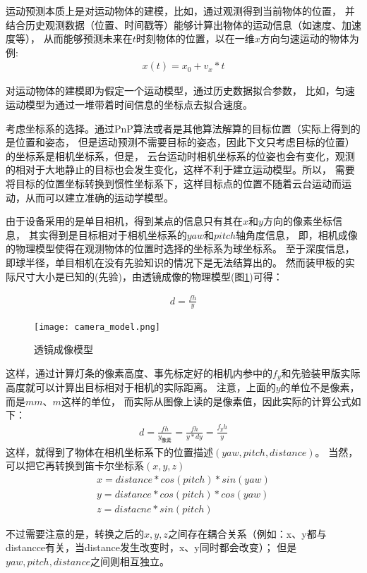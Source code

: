 运动预测本质上是对运动物体的建模，比如，通过观测得到当前物体的位置，
并结合历史观测数据（位置、时间戳等）能够计算出物体的运动信息（如速度、加速度等），
从而能够预测未来在$t$时刻物体的位置，以在一维$x$方向匀速运动的物体为例: 
\begin{gather}
    x(t) = x_0 + v_x*t
\end{gather}

对运动物体的建模即为假定一个运动模型，通过历史数据拟合参数，
比如，匀速运动模型为通过一堆带着时间信息的坐标点去拟合速度。\par

考虑坐标系的选择。通过PnP\cite{wu2006pnp}算法或者是其他算法解算的目标位置（实际上得到的是位置和姿态，
但是运动预测不需要目标的姿态，因此下文只考虑目标的位置）的坐标系是相机坐标系，但是，
云台运动时相机坐标系的位姿也会有变化，观测的相对于大地静止的目标也会发生变化，这样不利于建立运动模型。所以，
需要将目标的位置坐标转换到惯性坐标系下，这样目标点的位置不随着云台运动而运动，从而可以建立准确的运动学模型。\par
由于设备采用的是单目相机，得到某点的信息只有其在$x$和$y$方向的像素坐标信息，
其实得到是目标相对于相机坐标系的$yaw$和$pitch$轴角度信息，
即，相机成像的物理模型使得在观测物体的位置时选择的坐标系为球坐标系。
至于深度信息，即球半径，单目相机在没有先验知识的情况下是无法结算出的。
然而装甲板的实际尺寸大小是已知的(先验)，由透镜成像的物理模型(图\ref{透镜成像模型})可得：\par
\begin{gather}
    d = \frac{fh}{y} 
\end{gather}

\begin{figure}[H]
    \centering
    \texttt{[image: camera\_model.png]} 
    \caption{透镜成像模型}
    \label{透镜成像模型} 
\end{figure}    
这样，通过计算灯条的像素高度、事先标定好的相机内参中的$f_y$和先验装甲版实际高度就可以计算出目标相对于相机的实际距离。
注意，上面的$y$的单位不是像素，而是$mm$、$m$这样的单位，
而实际从图像上读的是像素值，因此实际的计算公式如下：
\begin{gather}
    d=\frac{fh}{y_{像素}}=\frac{fh}{y*dy}=\frac{f_yh}{y}
\end{gather}
这样，就得到了物体在相机坐标系下的位置描述$(yaw,pitch, distance)$。
当然，可以把它再转换到笛卡尔坐标系$(x,y,z)$
\begin{gather}
    x = distance*cos(pitch)*sin(yaw) \\
    y = distance*cos(pitch)*cos(yaw) \\
    z = distacne * sin(pitch)
\end{gather} \par
不过需要注意的是，转换之后的$x,y,z$之间存在耦合关系（例如：x、y都与distancce有关，当distance发生改变时，x、y同时都会改变）；
但是$yaw,pitch,distance$之间则相互独立。\par

